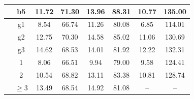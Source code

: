 \begin{table}[t]
{\begin{tabular}{|c|c||c|c|c|c|c|c|}
      & b5
      & 11.72 & 71.30
      & 13.96 & 88.31
      & 10.77 & 135.00 \\
      \hline
      \hline

      & g1
      & 8.54 & 66.74
      & 11.26 & 80.08
      & 6.85 & 114.01 \\

      & g2
      & 12.75 & 70.30
      & 14.58 & 85.02
      & 11.06 & 130.69 \\

      & g3
      & 14.62 & 68.53
      & 14.01 & 81.92
      & 12.22 & 132.31 \\
      \hline
      \hline

      & 1
      & 8.06 & 66.51
      & 9.94 & 79.00
      & 9.58 & 124.41 \\

      & 2
      & 10.54 & 68.82
      & 13.11 & 83.38
      & 10.81 & 128.74 \\

      & $\geq$3
      & 13.49 & 68.54
      & 14.92 & 81.08
      & -- & -- \\
      \hline
    \end{tabular}
  }
  \vspace{-1em}
\end{table}
